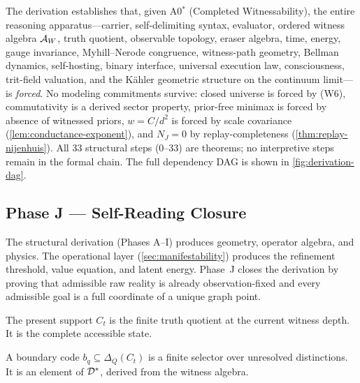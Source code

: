 The derivation establishes that, given A0$^*$ (Completed Witnessability),
the entire reasoning apparatus---carrier, self-delimiting syntax, evaluator,
ordered witness algebra $\mathcal{A}_W$, truth quotient, observable topology,
eraser algebra, time, energy, gauge invariance, Myhill--Nerode congruence,
witness-path geometry, Bellman dynamics, self-hosting, binary interface,
universal execution law, consciousness, trit-field valuation, and the
K\"{a}hler geometric structure on the continuum limit---is \emph{forced}.
No modeling commitments survive: closed universe is forced by (W6),
commutativity is a derived sector property, prior-free minimax is forced by
absence of witnessed priors, $w = C/d^2$ is forced by scale covariance
(\cref{lem:conductance-exponent}), and $N_J = 0$ by replay-completeness
(\cref{thm:replay-nijenhuis}).  All 33 structural steps
(0--33) are theorems; no interpretive steps remain in the formal chain.  The
full dependency DAG is shown in \cref{fig:derivation-dag}.


\subsection*{Phase J --- Self-Reading Closure}

The structural derivation (Phases A--I) produces geometry, operator algebra,
and physics.  The operational layer (\cref{sec:manifestability}) produces the
refinement threshold, value equation, and latent energy.  Phase~J closes the
derivation by proving that admissible raw reality is already observation-fixed
and every admissible goal is a full coordinate of a unique graph point.

\begin{theorem}
\label{thm:step34}
The present support $C_t$ is the finite truth quotient at the current
witness depth.  It is the complete accessible state.
\end{theorem}

\begin{theorem}
\label{thm:step35}
A boundary code $b_q \subseteq \Delta_Q(C_t)$ is a finite selector
over unresolved distinctions.  It is an element of $\mathcal{D}^*$, derived
from the witness algebra.
\end{theorem}

